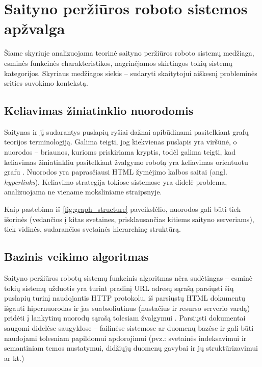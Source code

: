 \section{Saityno peržiūros roboto sistemos apžvalga}

Šiame skyriuje analizuojama teorinė saityno peržiūros roboto sistemų medžiaga, esminės funkcinės charakteristikos, nagrinėjamos skirtingos tokių sistemų kategorijos. Skyriaus medžiagos siekis -- sudaryti skaitytojui aiškesnį probleminės srities suvokimo kontekstą.

\subsection{Keliavimas žiniatinklio nuorodomis}

Saitynas ir jį sudarantys puslapių ryšiai dažnai apibūdinami pasitelkiant grafų teorijos terminologiją. Galima teigti, jog kiekvienas puslapis yra viršūnė, o nuorodos -- briaunos, kurioms priskiriama kryptis, todėl galima teigti, kad keliavimas žiniatinkliu pasitelkiant žvalgymo robotą yra keliavimas orientuotu grafu \cite{CategoriesOfWebCrawlersAndOverview}. Nuorodos yra paprasčiausi HTML žymėjimo kalbos saitai (angl. \textit{hyperlinks}). Keliavimo strategija tokiose sistemose yra didelė problema, analizuojama ne viename moksliniame straipsnyje.

Kaip pastebima iš \ref{fig:graph_structure} paveikslėlio, nuorodos gali būti tiek išorinės (vedančios į kitas svetaines, prisklausančias kitiems saityno serveriams), tiek vidinės, sudarančios svetainės hierarchinę struktūrą.

\subsection{Bazinis veikimo algoritmas}

Saityno peržiūros robotų sistemų funkcinis algoritmas nėra sudėtingas -- esminė tokių sistemų užduotis yra turint pradinį URL adresų sąrašą parsiųsti šių puslapių turinį naudojantis HTTP protokolu, iš parsiųstų HTML dokumentų išgauti hipernuorodas ir jas suabsoliutinus (nustačius ir resurso serverio vardą) pridėti į lankytinų nuorodų sąrašą tolesiam žvalgymui \cite{StanfWebCrawl}. Parsiųsti dokumentai saugomi didelėse saugyklose -- failinėse sistemose ar duomenų bazėse ir gali būti naudojami tolesniam papildomui apdorojimui (pvz.: svetainės indeksavimui ir semantiniam temos nustatymui, didžiųjų duomenų gavybai ir jų struktūrizavimui ar kt.)

